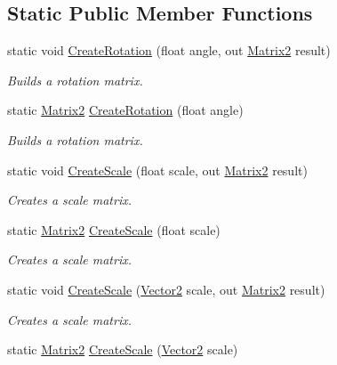 \subsection*{Static Public Member Functions}
\begin{DoxyCompactItemize}
\item 
static void \hyperlink{struct_open_t_k_1_1_matrix2_a14c30cc8079450f694f3f31206339650}{Create\-Rotation} (float angle, out \hyperlink{struct_open_t_k_1_1_matrix2}{Matrix2} result)
\begin{DoxyCompactList}\small\item\em Builds a rotation matrix. \end{DoxyCompactList}\item 
static \hyperlink{struct_open_t_k_1_1_matrix2}{Matrix2} \hyperlink{struct_open_t_k_1_1_matrix2_ab48e897254f497f624c66830937ed991}{Create\-Rotation} (float angle)
\begin{DoxyCompactList}\small\item\em Builds a rotation matrix. \end{DoxyCompactList}\item 
static void \hyperlink{struct_open_t_k_1_1_matrix2_a98bfa496c912749ca5d6f341c5791e7b}{Create\-Scale} (float scale, out \hyperlink{struct_open_t_k_1_1_matrix2}{Matrix2} result)
\begin{DoxyCompactList}\small\item\em Creates a scale matrix. \end{DoxyCompactList}\item 
static \hyperlink{struct_open_t_k_1_1_matrix2}{Matrix2} \hyperlink{struct_open_t_k_1_1_matrix2_af52692aab98a1ed57171e3863548dd3b}{Create\-Scale} (float scale)
\begin{DoxyCompactList}\small\item\em Creates a scale matrix. \end{DoxyCompactList}\item 
static void \hyperlink{struct_open_t_k_1_1_matrix2_a01086d45ade6fd4c2b6b7fe6270307c4}{Create\-Scale} (\hyperlink{struct_open_t_k_1_1_vector2}{Vector2} scale, out \hyperlink{struct_open_t_k_1_1_matrix2}{Matrix2} result)
\begin{DoxyCompactList}\small\item\em Creates a scale matrix. \end{DoxyCompactList}\item 
static \hyperlink{struct_open_t_k_1_1_matrix2}{Matrix2} \hyperlink{struct_open_t_k_1_1_matrix2_a26826a91ced1bd9cdd963f93147daec0}{Create\-Scale} (\hyperlink{struct_open_t_k_1_1_vector2}{Vector2} scale)

\end{DoxyCompactItemize}
